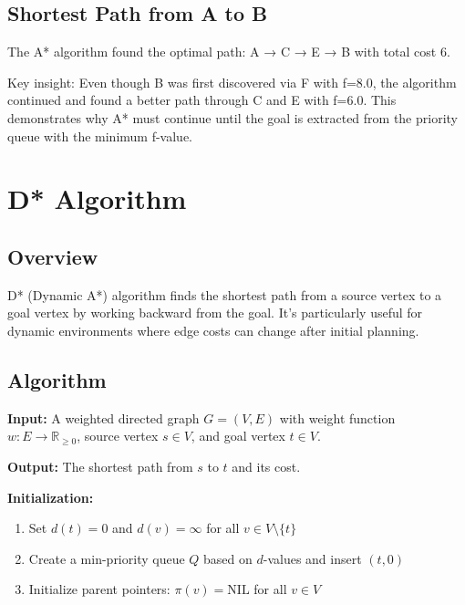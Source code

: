 \documentclass{article}
\begin{document}
\subsection{Shortest Path from A to B}
The A* algorithm found the optimal path: A → C → E → B with total cost 6.

Key insight: Even though B was first discovered via F with f=8.0, the algorithm continued and found a better path through C and E with f=6.0. This demonstrates why A* must continue until the goal is extracted from the priority queue with the minimum f-value.

\section{D* Algorithm}

\subsection{Overview}
D* (Dynamic A*) algorithm finds the shortest path from a source vertex to a goal vertex by working backward from the goal. It's particularly useful for dynamic environments where edge costs can change after initial planning.

\subsection{Algorithm}
\textbf{Input:} A weighted directed graph $G = (V, E)$ with weight function $w: E \to \mathbb{R}_{\geq 0}$, source vertex $s \in V$, and goal vertex $t \in V$.

\textbf{Output:} The shortest path from $s$ to $t$ and its cost.

\textbf{Initialization:}
\begin{enumerate}
    \item Set $d(t) = 0$ and $d(v) = \infty$ for all $v \in V \setminus \{t\}$
    \item Create a min-priority queue $Q$ based on $d$-values and insert $(t, 0)$
    \item Initialize parent pointers: $\pi(v) = \text{NIL}$ for all $v \in V$
\end{enumerate}
\end{document}
